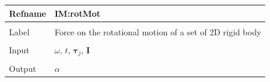 \documentclass[12pt]{article}
\begin{document}
\vspace{\baselineskip}
\noindent
\begin{minipage}{\textwidth}
\begin{tabular}{>{\raggedright}p{}>{\raggedright\arraybackslash}p{}}
\toprule \textbf{Refname} & \textbf{IM:rotMot}
\label{IM:rotMot}
\\ \midrule \\
Label & Force on the rotational motion of a set of 2D rigid body
        
\\ \midrule \\
Input & $ω$, $t$, ${\mathbf{τ}_{j}}$, $\mathbf{I}$
        
\\ \midrule \\
Output & $α$
         

\end{tabular}
\end{minipage}
\end{document}
